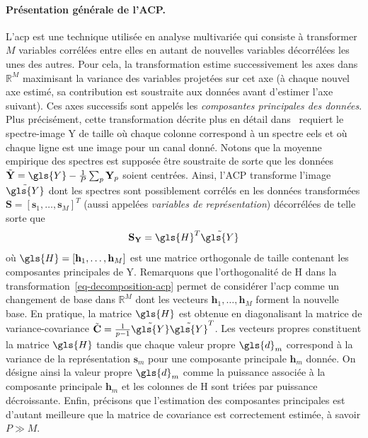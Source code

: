     \paragraph{Présentation générale de l'ACP.} L'\gls{acp} est une technique utilisée en analyse multivariée qui consiste à transformer $M$ variables corrélées entre elles en autant de nouvelles variables décorrélées les unes des autres. Pour cela, la transformation estime successivement les axes dans $\mathbb{R}^M$ maximisant la variance des variables projetées sur cet axe (à chaque nouvel axe estimé, sa contribution est soustraite aux données avant d'estimer l'axe suivant). Ces axes successifs sont appelés les \emph{composantes principales des données}.
    Plus précisément, cette transformation décrite plus en détail dans~\cite{jolliffe2002springer} requiert le spectre-image \gls{Y} de taille  où chaque colonne correspond à un spectre \gls{eels} et où chaque ligne est une image pour un canal donné. Notons que la moyenne empirique des spectres est supposée être soustraite de sorte que les données $\tilde{\mathbf{Y}}=\gls{Y}-\frac{1}{P}\sum_p\mathbf{Y}_p$ soient centrées.
    Ainsi, l'ACP transforme l'image $\tilde{\gls{Y}}$ dont les spectres sont possiblement corrélés en les données transformées $\mathbf{S} = [\mathbf{s}_1,\dots,\mathbf{s}_M]^T$ (aussi appelées \emph{variables de représentation}) décorrélées de telle sorte que
    \begin{equation}\label{eq-decomposition-acp}
    \mathbf{S}_\mathbf{Y} = \gls{H}^T\tilde{\gls{Y}}
    \end{equation}
    où $\gls{H} = [\mathbf{h}_1,\dots,\mathbf{h}_M]$ est une matrice orthogonale de taille  contenant les composantes principales de \gls{Y}. Remarquons que l'orthogonalité de \gls{H} dans la transformation~\eqref{eq-decomposition-acp} permet de considérer l'\gls{acp} comme un changement de base dans $\mathbb{R}^M$ dont les vecteurs $\mathbf{h}_1,\dots,\mathbf{h}_M$ forment la nouvelle base. 
    En pratique, la matrice $\gls{H}$ est obtenue en diagonalisant la matrice de variance-covariance $\tilde{\mathbf{C}} = \frac{1}{p-1}\tilde{\gls{Y}}\tilde{\gls{Y}}^T$. Les vecteurs propres constituent la matrice $\gls{H}$ tandis que chaque valeur propre $\gls{d}_m$ correspond à la variance de la représentation $\mathbf{s}_m$ pour une composante principale $\mathbf{h}_m$ donnée. On désigne ainsi la valeur propre $\gls{d}_m$ comme la puissance associée à la composante principale $\mathbf{h}_m$ et les colonnes de \gls{H} sont triées par puissance décroissante. 
    Enfin, précisons que l'estimation des composantes principales est d'autant meilleure que la matrice de covariance est correctement estimée, à savoir $P\gg M$.


